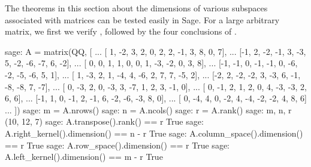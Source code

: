 The theorems in this section about the dimensions of various subspaces associated with matrices can be tested easily in Sage.  For a large arbitrary matrix, we first we verify , followed by the four conclusions of .
%
\begin{sageexample}
sage: A = matrix(QQ, [
...       [ 1, -2,  3,  2,  0,  2,  2, -1,  3,  8,  0,  7],
...       [-1,  2, -2, -1,  3, -3,  5, -2, -6, -7,  6, -2],
...       [ 0,  0,  1,  1,  0,  0,  1, -3, -2,  0,  3,  8],
...       [-1, -1,  0, -1, -1,  0, -6, -2, -5, -6,  5,  1],
...       [ 1, -3,  2,  1, -4,  4, -6,  2,  7,  7, -5,  2],
...       [-2,  2, -2, -2,  3, -3,  6, -1, -8, -8,  7, -7],
...       [ 0, -3,  2,  0, -3,  3, -7,  1,  2,  3, -1,  0],
...       [ 0, -1,  2,  1,  2,  0,  4, -3, -3,  2,  6,  6],
...       [-1,  1,  0, -1,  2, -1,  6, -2, -6, -3,  8,  0],
...       [ 0, -4,  4,  0, -2,  4, -4, -2, -2,  4,  8,  6]
...                  ])
sage: m = A.nrows()
sage: n = A.ncols()
sage: r = A.rank()
sage: m, n, r
(10, 12, 7)
sage: A.transpose().rank() == r
True
sage: A.right_kernel().dimension() == n - r
True
sage: A.column_space().dimension() == r
True
sage: A.row_space().dimension() == r
True
sage: A.left_kernel().dimension() == m - r
True
\end{sageexample}
%
\begin{sageverbatim}
\end{sageverbatim}
%

